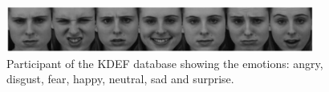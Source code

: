 \begin{figure}[!htb]	\includegraphics[width=0.9\textwidth]{images/KDEF.png} 
    \centering

\caption{
Participant of the KDEF database showing the emotions: angry, disgust, fear, happy, neutral, sad and surprise.
} 

\label{fig:KDEF}
\end{figure}